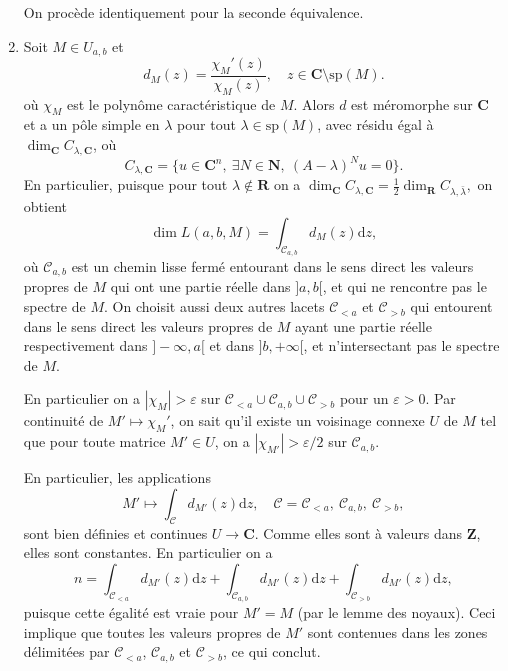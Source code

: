\documentclass[a4paper,12pt,openany]{article}
\theoremstyle{plain}
\theoremstyle{definition}
\newcommand{\dd}{\mathrm{d}}
\newcommand{\R}{\mathbf{R}}
\newcommand{\Z}{\mathbf{Z}}
\newcommand{\N}{\mathbf{N}}
\newcommand{\C}{\mathbf{C}}
\begin{document}
\begin{enumerate}[resume]
On proc\`ede identiquement pour la seconde \'equivalence.

\item Soit $M \in U_{a,b}$ et
$$
d_M(z) = \frac{\chi_M'(z)}{\chi_M(z)}, \quad z \in \C \setminus \mathrm{sp}(M).
$$
o\`u $\chi_M$ est le polyn\^ome caract\'eristique de $M$. Alors $d$ est m\'eromorphe sur $\C$ et a un p\^ole simple en $\lambda$ pour tout $\lambda \in \mathrm{sp}(M)$, avec r\'esidu \'egal \`a $\dim_\C C_{\lambda,\C}$, o\`u 
$$
C_{\lambda, \C} = \{u \in \C^n,~\exists N \in \N,~(A-\lambda)^Nu = 0\}.
$$
En particulier, puisque pour tout $\lambda \notin \R$ on a $\dim_\C C_{\lambda, \C} = \frac{1}{2} \dim_\R C_{\lambda, \bar \lambda},$ on obtient
$$
\dim L(a, b, M) = \int_{\mathscr{C}_{a,b}} d_M(z) \dd z,
$$
o\`u $\mathscr{C}_{a,b}$ est un chemin lisse ferm\'e entourant dans le sens direct les valeurs propres de $M$ qui ont une partie r\'eelle dans $]a,b[$, et qui ne rencontre pas le spectre de $M$. On choisit aussi deux autres lacets $\mathscr{C}_{<a}$ et $\mathscr{C}_{>b}$ qui entourent dans le sens direct les valeurs propres de $M$ ayant une partie r\'eelle respectivement dans $]-\infty, a[$ et dans $]b, +\infty[$, et n'intersectant pas le spectre de $M$. 

En particulier on a $|\chi_M|>\varepsilon$ sur $\mathscr{C}_{<a} \cup \mathscr{C}_{a,b} \cup \mathscr{C}_{>b} $ pour un $\varepsilon > 0$. Par continuit\'e de $M' \mapsto \chi_M'$, on sait qu'il existe un voisinage connexe $U$ de $M$ tel que pour toute matrice $M' \in U$, on a $|\chi_{M'}|>\varepsilon/2$ sur $\mathscr{C}_{a,b}$. 

En particulier, les applications
$$
M' \mapsto \int_{\mathscr{C}} d_{M'}(z) \dd z, \quad \mathscr{C} = \mathscr{C}_{<a}, ~\mathscr{C}_{a,b},~\mathscr{C}_{>b},
$$
sont bien d\'efinies et continues $U \to \C$. Comme elles sont \`a valeurs dans $\Z$, elles sont constantes. En particulier on a
$$
n = \int_{\mathscr{C}_{<a}} d_{M'}(z) \dd z + \int_{\mathscr{C}_{a,b}} d_{M'}(z) \dd z + \int_{\mathscr{C}_{>b}} d_{M'}(z) \dd z,
$$
puisque cette \'egalit\'e est vraie pour $M' = M$ (par le lemme des noyaux). Ceci implique que toutes les valeurs propres de $M'$ sont contenues dans les zones d\'elimit\'ees par $\mathscr{C}_{<a}$, $\mathscr{C}_{a,b}$ et $\mathscr{C}_{>b}$, ce qui conclut.

\end{enumerate}
\vspace{0.6cm}

 \vspace{1.5mm} 
\end{document}
